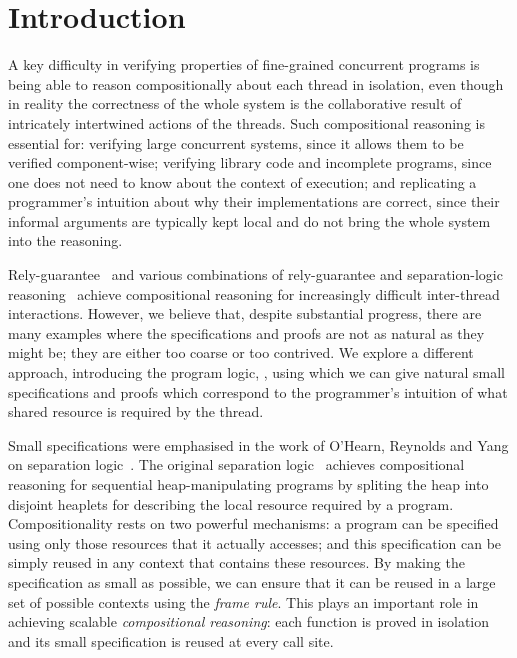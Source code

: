 \section{Introduction}
\label{sec:introduction}




A key difficulty in verifying properties of fine-grained concurrent
programs is being able to reason compositionally about each thread in
isolation, even though in reality the correctness of the whole system
is the collaborative result of intricately intertwined actions of the
threads.  Such compositional reasoning is essential for: verifying
large concurrent systems, since it allows them to be verified
component-wise;  verifying library code and incomplete programs,
since one does not need to know about the context of execution; and 
replicating a programmer's intuition about why their implementations
are correct, since their informal arguments are typically  kept local and do
not bring the whole system into the reasoning.


Rely-guarantee~\cite{rg} and various combinations of
rely-guarantee and separation-logic
reasoning~\cite{viktor-marriage,dg,lrg,cap-ecoop10,icap,tada} achieve
compositional reasoning for increasingly difficult inter-thread
interactions. However, we believe that, despite substantial progress, there are many
examples where the specifications and proofs are not as natural as
they might be; they  are either too coarse or
too 
contrived. 
We explore a different approach, introducing the
program logic, \colosl, using which we can give natural small
specifications and proofs which correspond to the  programmer's intuition of what shared
resource
is required by the thread. 




Small specifications were emphasised in the work of O'Hearn, Reynolds
and Yang on separation logic~\cite{o2001local}.  The original
separation logic~\cite{rey02,seplog} achieves compositional reasoning
for sequential heap-manipulating programs by spliting the heap into
disjoint heaplets for describing the local resource required by a
program. Compositionality rests on two powerful mechanisms: a program
can be specified using only those resources that it actually accesses;
and this specification can be simply reused in any context that
contains these resources.  By making the specification as small as
possible, we can ensure that it can be reused in a large set of
possible contexts using the {\em frame rule}. This plays an important
role in achieving scalable \emph{compositional reasoning}: each
function is proved in isolation and its small specification is reused
at every call site.


